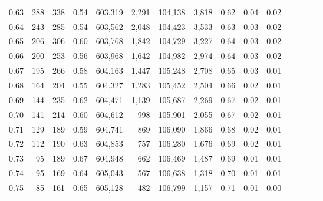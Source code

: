 \begin{tabular}{rrrcrrrrrrrrrrr}
0.63 &     288 &    338 &                                       0.54 &  603,319 &    2,291 &  104,138 &    3,818 &  0.62 &  0.04 &                         0.02 \\
0.64 &     243 &    285 &                                       0.54 &  603,562 &    2,048 &  104,423 &    3,533 &  0.63 &  0.03 &                         0.02 \\
0.65 &     206 &    306 &                                       0.60 &  603,768 &    1,842 &  104,729 &    3,227 &  0.64 &  0.03 &                         0.02 \\
0.66 &     200 &    253 &                                       0.56 &  603,968 &    1,642 &  104,982 &    2,974 &  0.64 &  0.03 &                         0.02 \\
0.67 &     195 &    266 &                                       0.58 &  604,163 &    1,447 &  105,248 &    2,708 &  0.65 &  0.03 &                         0.01 \\
0.68 &     164 &    204 &                                       0.55 &  604,327 &    1,283 &  105,452 &    2,504 &  0.66 &  0.02 &                         0.01 \\
0.69 &     144 &    235 &                                       0.62 &  604,471 &    1,139 &  105,687 &    2,269 &  0.67 &  0.02 &                         0.01 \\
0.70 &     141 &    214 &                                       0.60 &  604,612 &      998 &  105,901 &    2,055 &  0.67 &  0.02 &                         0.01 \\
0.71 &     129 &    189 &                                       0.59 &  604,741 &      869 &  106,090 &    1,866 &  0.68 &  0.02 &                         0.01 \\
0.72 &     112 &    190 &                                       0.63 &  604,853 &      757 &  106,280 &    1,676 &  0.69 &  0.02 &                         0.01 \\
0.73 &      95 &    189 &                                       0.67 &  604,948 &      662 &  106,469 &    1,487 &  0.69 &  0.01 &                         0.01 \\
0.74 &      95 &    169 &                                       0.64 &  605,043 &      567 &  106,638 &    1,318 &  0.70 &  0.01 &                         0.01 \\
0.75 &      85 &    161 &                                       0.65 &  605,128 &      482 &  106,799 &    1,157 &  0.71 &  0.01 &                         0.00 \\

\end{tabular}
